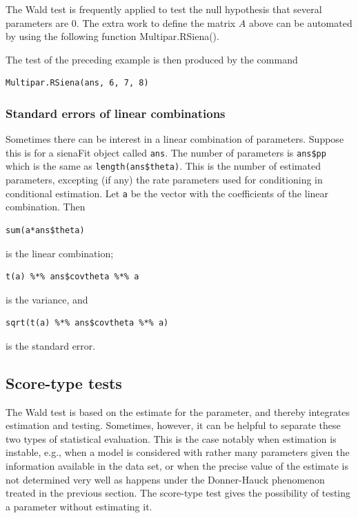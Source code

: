 \documentclass[a4paper,fleqn,11pt]{article}
\newcommand{\+}{\, + \,}
\newcommand{\sfn}[1]{\textsf{#1}}
\begin{document}
The Wald test is frequently applied to test the null
hypothesis that several parameters are 0.
The extra work to define the matrix $A$ above can be automated
by using the following function \sfn{Multipar.RSiena()}.

The test of the preceding example is then produced by the command
\begin{verbatim}
Multipar.RSiena(ans, 6, 7, 8)
\end{verbatim}

\subsubsection{Standard errors of linear combinations}

Sometimes there can be interest in a linear combination of parameters.
Suppose this is for a \sfn{sienaFit} object called \texttt{ans}.
The number of parameters is
\texttt{ans\$pp} which is the same as \texttt{length(ans\$theta)}.
This is the number of estimated parameters, excepting (if any) the rate
parameters used for conditioning in conditional estimation.
Let \texttt{a} be the vector with the coefficients of the linear combination.
Then
\begin{verbatim}
sum(a*ans$theta)
\end{verbatim}
 is the linear combination;
\begin{verbatim}
t(a) %*% ans$covtheta %*% a
\end{verbatim}
is the variance, and
\begin{verbatim}
sqrt(t(a) %*% ans$covtheta %*% a)
\end{verbatim}
is the standard error.



\subsection{Score-type tests}
\label{S_Scoretest}

The Wald test is based on the estimate for the parameter,
and thereby integrates estimation and testing.
Sometimes, however, it can be helpful to separate these two
types of statistical evaluation.
This is the case notably when estimation is instable, e.g.,
when a model is considered with rather many parameters given
the information available in the data set,
or when the precise value of the estimate is not determined
very well as happens under the Donner-Hauck phenomenon
treated in the previous section.
The score-type test gives the possibility of testing
a parameter without estimating it.
\end{document}
